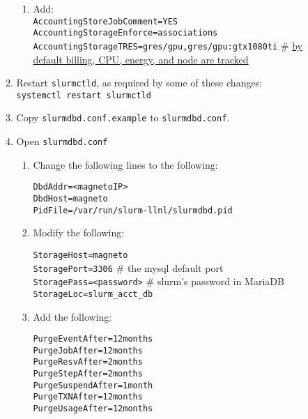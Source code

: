 \begin{enumerate}
\begin{enumerate}
\begin{enumerate}
		\item Add: \\
		\texttt{AccountingStoreJobComment=YES} \\
		\texttt{AccountingStorageEnforce=associations} \\
		\texttt{AccountingStorageTRES=gres/gpu,gres/gpu:gtx1080ti}	\quad \# \href{https://slurm.schedmd.com/tres.html}{by default billing, CPU, energy, and node are tracked}
		\end{enumerate}
	
	\item Restart \texttt{slurmctld}, as required by some of these changes: \\ %
	\texttt{systemctl restart slurmctld}

	\item Copy \texttt{slurmdbd.conf.example} to \texttt{slurmdbd.conf}.

	\item Open \texttt{slurmdbd.conf} 

		\begin{enumerate}
		\item Change the following lines to the following:

			\texttt{DbdAddr=<magnetoIP>} \\
			\texttt{DbdHost=magneto} \\
			\texttt{PidFile=/var/run/slurm-llnl/slurmdbd.pid}  %
	
		\item Modify the following:

			\texttt{StorageHost=magneto} \\
			\texttt{StoragePort=3306}  \quad \# the mysql default port \\
			\texttt{StoragePass=<password>}		\quad \# slurm's password in MariaDB
			\texttt{StorageLoc=slurm\_acct\_db}
	
		\item Add the following:

			\texttt{PurgeEventAfter=12months} \\
			\texttt{PurgeJobAfter=12months} \\
			\texttt{PurgeResvAfter=2months} \\
			\texttt{PurgeStepAfter=2months} \\
			\texttt{PurgeSuspendAfter=1month} \\
			\texttt{PurgeTXNAfter=12months} \\
			\texttt{PurgeUsageAfter=12months}
		\end{enumerate}


\end{enumerate}
\end{enumerate}
